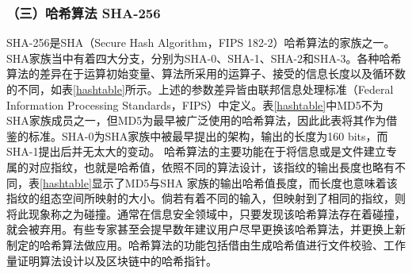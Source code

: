 				\subsubsection{（三）哈希算法 SHA-256}
				SHA-256是SHA（Secure Hash Algorithm，FIPS 182-2）\supercite{DBLP:conf/fse/KhovratovichRS12}哈希算法的家族之一。SHA家族当中有着四大分支，分别为SHA-0、SHA-1、SHA-2和SHA-3。各种哈希算法的差异在于运算初始变量、算法所采用的运算子、接受的信息长度以及循环数的不同，如表\ref{hashtable}所示。上述的参数差异皆由联邦信息处理标准（Federal Information Processing Standards，FIPS）中定义。表\ref{hashtable}中MD5不为SHA家族成员之一，但MD5为最早被广泛使用的哈希算法，因此此表将其作为借鉴的标准。SHA-0为SHA家族中被最早提出的架构，输出的长度为160 bits，而SHA-1提出后并无太大的变动。
				哈希算法的主要功能在于将信息或是文件建⽴专属的对应指纹，也就是哈希值，依照不同的算法设计，该指纹的输出⾧度也略有不同，表\ref{hashtable}显示了MD5与SHA 家族的输出哈希值⾧度，而长度也意味着该指纹的组态空间所映射的大小。倘若有着不同的输入，但映射到了相同的指纹，则将此现象称之为碰撞。通常在信息安全领域中，只要发现该哈希算法存在着碰撞，就会被弃用。有些专家甚⾄会提早数年建议用户尽早更换该哈希算法，并更换上新制定的哈希算法做应⽤。哈希算法的功能包括借由生成哈希值进行文件校验、工作量证明算法设计以及区块链中的哈希指针\supercite{Double-spendAttackModelswithTimeAdvantangeforBitcoin}。

